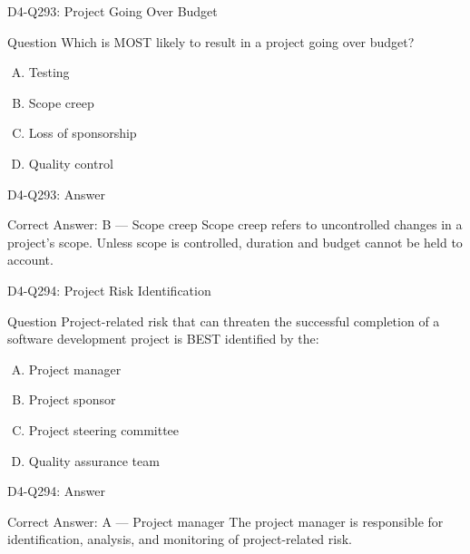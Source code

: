 \documentclass{beamer}
\begin{document}
	\begin{frame}{D4-Q293: Project Going Over Budget}
		\begin{block}{Question}
			Which is MOST likely to result in a project going over budget?
		\end{block}
		\begin{enumerate}[(A)]
			\item Testing
			\item Scope creep
			\item Loss of sponsorship
			\item Quality control
		\end{enumerate}
	\end{frame}
	\begin{frame}{D4-Q293: Answer}
		\begin{block}{Correct Answer: B --- Scope creep}
			Scope creep refers to uncontrolled changes in a project's scope. Unless scope is controlled, duration and budget cannot be held to account.
		\end{block}
	\end{frame}
	
	\begin{frame}{D4-Q294: Project Risk Identification}
		\begin{block}{Question}
			Project-related risk that can threaten the successful completion of a software development project is BEST identified by the:
		\end{block}
		\begin{enumerate}[(A)]
			\item Project manager
			\item Project sponsor
			\item Project steering committee
			\item Quality assurance team
		\end{enumerate}
	\end{frame}
	\begin{frame}{D4-Q294: Answer}
		\begin{block}{Correct Answer: A --- Project manager}
			The project manager is responsible for identification, analysis, and monitoring of project-related risk.
		\end{block}
	\end{frame}
	
\end{document}
